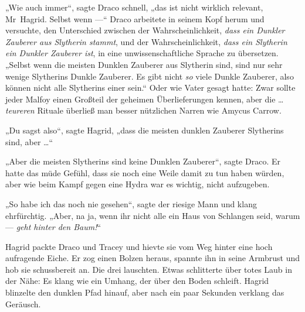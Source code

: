 „Wie auch immer“, sagte Draco schnell, „das ist nicht wirklich relevant, Mr~Hagrid. Selbst wenn —“ Draco arbeitete in seinem Kopf herum und versuchte, den Unterschied zwischen der Wahrscheinlichkeit, \emph{dass ein Dunkler Zauberer aus Slytherin stammt}, und der Wahrscheinlichkeit, \emph{dass ein Slytherin ein Dunkler Zauberer ist}, in eine unwissenschaftliche Sprache zu übersetzen.
„Selbst wenn die meisten Dunklen Zauberer aus Slytherin sind, sind nur sehr wenige Slytherins Dunkle Zauberer. Es gibt nicht \emph{so} viele Dunkle Zauberer, also können nicht alle Slytherins einer sein.“
Oder wie Vater gesagt hatte: Zwar sollte jeder Malfoy einen Großteil der geheimen Überlieferungen kennen, aber die … \emph{teureren} Rituale überließ man besser nützlichen Narren wie Amycus Carrow.

„Du sagst also“, sagte Hagrid, „dass die meisten dunklen Zauberer Slytherins sind, aber …“

„Aber die meisten Slytherins sind keine Dunklen Zauberer“, sagte Draco.
Er hatte das müde Gefühl, dass sie noch eine Weile damit zu tun haben würden, aber wie beim Kampf gegen eine Hydra war es wichtig, nicht aufzugeben.

„So habe ich das noch nie gesehen“, sagte der riesige Mann und klang ehrfürchtig.
„Aber, na ja, wenn ihr nicht alle ein Haus von Schlangen seid, warum — \emph{geht hinter den Baum!}“

Hagrid packte Draco und Tracey und hievte sie vom Weg hinter eine hoch aufragende Eiche. Er zog einen Bolzen heraus, spannte ihn in seine Armbrust und hob sie schussbereit an.
Die drei lauschten. Etwas schlitterte über totes Laub in der Nähe: Es klang wie ein Umhang, der über den Boden schleift. Hagrid blinzelte den dunklen Pfad hinauf, aber nach ein paar Sekunden verklang das Geräusch.

